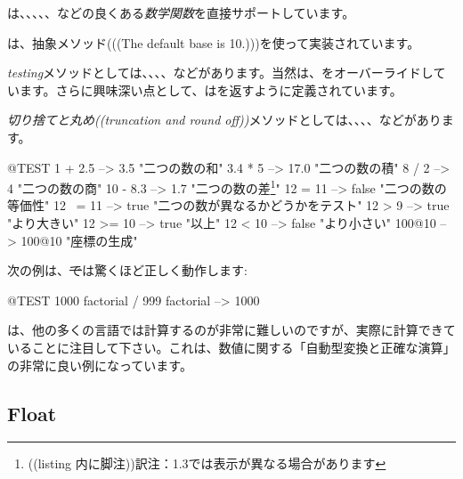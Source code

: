 \documentclass[a4paper,10pt,twoside]{book}
\begin{document}
は、、、、、などの良くある\emph{数学関数}を直接サポートしています。

は、抽象メソッド(((The default base is 10.)))を使って実装されています。

\emph{testing}メソッドとしては、、、、などがあります。当然は、をオーバーライドしています。さらに興味深い点として、はを返すように定義されています。

\emph{切り捨てと丸め((truncation and round off))}メソッドとしては、、、、などがあります。

\begin{code}{@TEST}
1 + 2.5     --> 3.5             "二つの数の和"
3.4 * 5      --> 17.0           "二つの数の積"
8 / 2         --> 4                 "二つの数の商"
10 - 8.3   --> 1.7              "二つの数の差\footnote{((listing 内に脚注))訳注：\pharo 1.3では表示が異なる場合があります}"
12 = 11    --> false           "二つの数の等価性"
12 ~= 11 --> true            "二つの数が異なるかどうかをテスト"
12 > 9      --> true            "より大きい"
12 >= 10  --> true            "以上"
12 < 10    --> false           "より小さい"
100@10   --> 100@10    "座標の生成"
\end{code}

次の例は、\st では驚くほど正しく動作します:
\begin{code}{@TEST}
1000 factorial / 999 factorial --> 1000
\end{code}
は、他の多くの言語では計算するのが非常に難しいのですが、実際に計算できていることに注目して下さい。これは、数値に関する「自動型変換と正確な演算」の非常に良い例になっています。


\subsection{Float}
\end{document}

